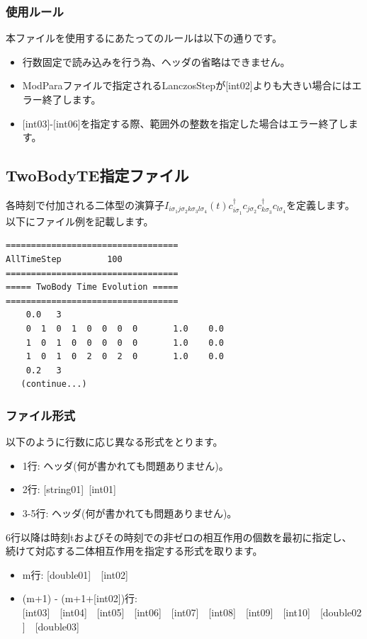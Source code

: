 \subsubsection{使用ルール}
本ファイルを使用するにあたってのルールは以下の通りです。
\begin{itemize}
\item 行数固定で読み込みを行う為、ヘッダの省略はできません。
\item ModParaファイルで指定されるLanczosStepが$[$int02$]$よりも大きい場合にはエラー終了します。
\item $[$int03$]$-$[$int06$]$を指定する際、範囲外の整数を指定した場合はエラー終了します。
\end{itemize}


\newpage
\subsection{{TwoBodyTE指定ファイル}}
\label{Subsec:2TE}
各時刻で付加される二体型の演算子$I_{i\sigma_1j \sigma_2 k \sigma_3 l \sigma_4}(t)c_{i\sigma_1}^{\dagger}c_{j\sigma_2}c_{k\sigma_3}^{\dagger}c_{l\sigma_4}$を定義します。
以下にファイル例を記載します。

\begin{minipage}{12.5cm}
\begin{screen}
\begin{verbatim}
==================================
AllTimeStep         100
==================================
===== TwoBody Time Evolution =====
==================================
    0.0   3
    0  1  0  1  0  0  0  0       1.0    0.0
    1  0  1  0  0  0  0  0       1.0    0.0
    1  0  1  0  2  0  2  0       1.0    0.0 
    0.2   3
   (continue...)
\end{verbatim}
\end{screen}
\end{minipage}

\subsubsection{ファイル形式}
以下のように行数に応じ異なる形式をとります。
 \begin{itemize}
   \item  1行:  ヘッダ(何が書かれても問題ありません)。
   \item  2行:   [string01]~[int01]
   \item  3-5行:  ヘッダ(何が書かれても問題ありません)。
  \end{itemize}
6行以降は時刻tおよびその時刻での非ゼロの相互作用の個数を最初に指定し、
続けて対応する二体相互作用を指定する形式を取ります。
 \begin{itemize}
    \item  m行: [double01]~~[int02]
    \item  (m+1) - (m+1+[int02])行: [int03]~~[int04]~~[int05]~~[int06]~~[int07]~~[int08]~~[int09]~~[int10]~~[double02]~~[double03]
 \end{itemize}
   


